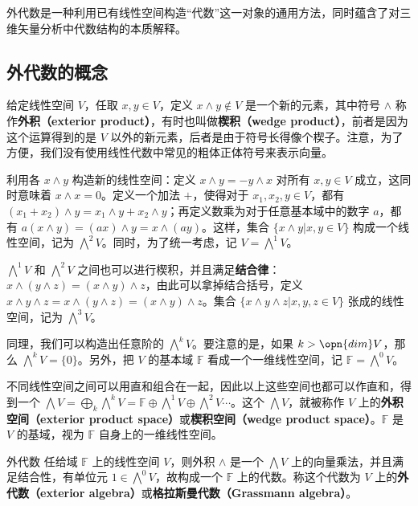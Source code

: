 
外代数是一种利用已有线性空间构造“代数”这一对象的通用方法，同时蕴含了对三维矢量分析中代数结构的本质解释。

\subsection{外代数的概念}

给定线性空间 $V$，任取 $x, y\in V$，定义 $x\wedge y\not\in V$ 是一个新的元素，其中符号 $\wedge$ 称作\textbf{外积（exterior product）}，有时也叫做\textbf{楔积（wedge product）}，前者是因为这个运算得到的是 $V$ 以外的新元素，后者是由于符号长得像个楔子。注意，为了方便，我们没有使用线性代数中常见的粗体正体符号来表示向量。

利用各 $x\wedge y$ 构造新的线性空间：定义 $x\wedge y=-y\wedge x$ 对所有 $x, y\in V$ 成立，这同时意味着 $x\wedge x=0$。定义一个加法 $+$，使得对于 $x_1, x_2, y\in V$，都有 $(x_1+x_2)\wedge y=x_1\wedge y+x_2\wedge y$；再定义数乘为对于任意基本域中的数字 $a$，都有 $a(x\wedge y)=(ax)\wedge y=x\wedge(ay)$。这样，集合 $\{x\wedge y|x, y\in V\}$ 构成一个线性空间，记为 $\bigwedge^2 V$。同时，为了统一考虑，记 $V=\bigwedge^1 V$。

$\bigwedge^1 V$ 和 $\bigwedge^2 V$ 之间也可以进行楔积，并且满足\textbf{结合律}：$x\wedge(y\wedge z)=(x\wedge y)\wedge z$，由此可以拿掉结合括号，定义 $x\wedge y\wedge z=x\wedge(y\wedge z)=(x\wedge y)\wedge z$。集合 $\{x\wedge y\wedge z|x, y, z\in V\}$ 张成的线性空间，记为 $\bigwedge^3 V$。

同理，我们可以构造出任意阶的 $\bigwedge^k V$。要注意的是，如果 $k>\opn{dim} V$，那么 $\bigwedge^k V=\{0\}$。另外，把 $V$ 的基本域 $\mathbb{F}$ 看成一个一维线性空间，记 $\mathbb{F}=\bigwedge^0 V$。

不同线性空间之间可以用直和组合在一起，因此以上这些空间也都可以作直和，得到一个 $\bigwedge V=\bigoplus_k\bigwedge^k V=\mathbb{F}\oplus\bigwedge^1V\oplus\bigwedge^2V\cdots$。这个 $\bigwedge V$，就被称作 $V$ 上的\textbf{外积空间（exterior product space）}或\textbf{楔积空间（wedge product space）}。$\mathbb{F}$ 是 $V$ 的基域，视为 $\mathbb{F}$ 自身上的一维线性空间。

\begin{theorem}{外代数}
任给域 $\mathbb{F}$ 上的线性空间 $V$，则外积 $\wedge$ 是一个 $\bigwedge V$ 上的向量乘法，并且满足结合性，有单位元 $1\in \bigwedge^0 V$，故构成一个 $\mathbb{F}$ 上的代数。称这个代数为 $V$ 上的\textbf{外代数（exterior algebra）}或\textbf{格拉斯曼代数（Grassmann algebra）}。
\end{theorem}

